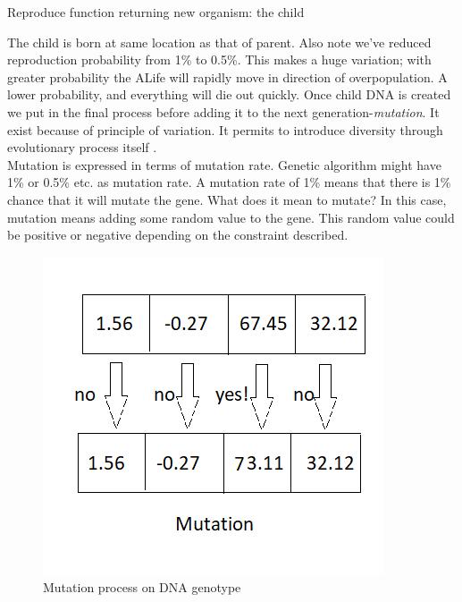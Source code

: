 \documentclass[conference]{IEEEtran}
\begin{document}
\begin{algorithm}
\caption{Reproduce function returning new organism: the child}
\begin{algorithmic} 
\ELSE
{}
\ENDIF
\end{algorithmic}
\end{algorithm}
The child is born at same location as that of parent. Also note we've reduced reproduction probability from 1\% to 0.5\%. This makes a huge variation; with greater probability the ALife will rapidly move in direction of overpopulation. A lower probability, and everything will die out quickly. Once child DNA is created we put in the final process before adding it to the next generation-\textit{mutation}. It exist because of principle of variation. It permits to introduce diversity through evolutionary process itself \cite{Stanley}.\\
Mutation is expressed in terms of mutation rate. Genetic algorithm might have 1\% or 0.5\% etc. as mutation rate. A mutation rate of 1\% means that there is 1\% chance that it will mutate the gene. What does it mean to mutate? In this case, mutation means adding some random value to the gene. This random value could be positive or negative depending on the constraint described.\\
\begin{figure}
	\includegraphics[scale=1]{mutation.png}
	\caption{Mutation process on DNA genotype}
	\label{fig:mutation}
\end{figure}
\end{document}
